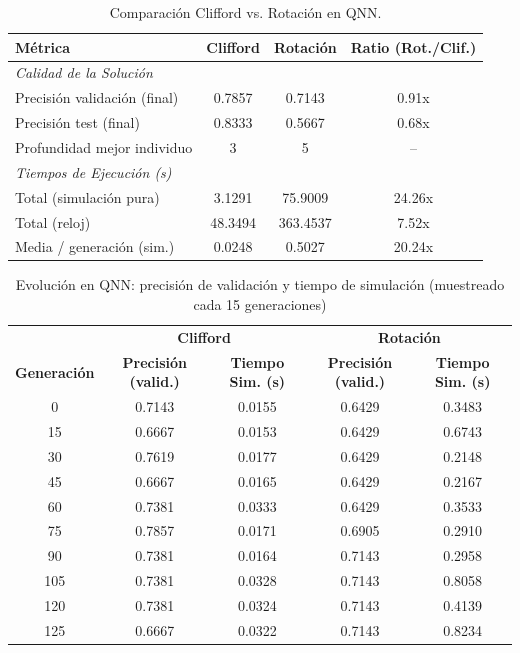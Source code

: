 \begin{table}[htbp]
\centering
\begin{tabular}{lccc}
\toprule
\textbf{Métrica} & \textbf{Clifford} & \textbf{Rotación} & \textbf{Ratio (Rot./Clif.)} \\
\midrule
\multicolumn{4}{l}{\textit{Calidad de la Solución}} \\
\midrule
Precisión validación (final) & 0.7857 & 0.7143 & 0.91x \\
Precisión test (final) & 0.8333 & 0.5667 & 0.68x \\
Profundidad mejor individuo & 3 & 5 & -- \\
\midrule
\multicolumn{4}{l}{\textit{Tiempos de Ejecución (s)}} \\
\midrule
Total (simulación pura) & 3.1291 & 75.9009 & 24.26x \\
Total (reloj) & 48.3494 & 363.4537 & 7.52x \\
Media / generación (sim.) & 0.0248 & 0.5027 & 20.24x \\
\bottomrule
\end{tabular}
\caption{Comparación Clifford vs. Rotación en QNN.}
\label{tab:comparison-qnn}
\end{table}

\begin{table}[htbp]
\centering
\begin{tabular}{c | cc | cc}
\toprule
& \multicolumn{2}{c|}{\textbf{Clifford}} & \multicolumn{2}{c}{\textbf{Rotación}} \\
\textbf{Generación} & \textbf{Precisión (valid.)} & \textbf{Tiempo Sim. (s)} & \textbf{Precisión (valid.)} & \textbf{Tiempo Sim. (s)} \\
\midrule
0 & 0.7143 & 0.0155 & 0.6429 & 0.3483 \\
15 & 0.6667 & 0.0153 & 0.6429 & 0.6743 \\
30 & 0.7619 & 0.0177 & 0.6429 & 0.2148 \\
45 & 0.6667 & 0.0165 & 0.6429 & 0.2167 \\
60 & 0.7381 & 0.0333 & 0.6429 & 0.3533 \\
75 & 0.7857 & 0.0171 & 0.6905 & 0.2910 \\
90 & 0.7381 & 0.0164 & 0.7143 & 0.2958 \\
105 & 0.7381 & 0.0328 & 0.7143 & 0.8058 \\
120 & 0.7381 & 0.0324 & 0.7143 & 0.4139 \\
125 & 0.6667 & 0.0322 & 0.7143 & 0.8234 \\
\bottomrule
\end{tabular}
\caption{Evolución en QNN: precisión de validación y tiempo de simulación (muestreado cada 15 generaciones)}
\label{tab:history-qnn}
\end{table}
